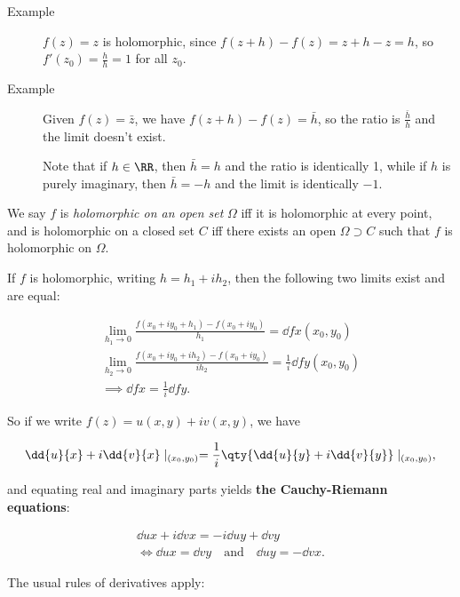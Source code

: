 \begin{description}
\item[Example]
\(f(z) = z\) is holomorphic, since \(f(z+ h) - f(z) = z+h-z = h\), so
\(f'(z_0) = \frac h h = 1\) for all \(z_0\).
\item[Example]
Given \(f(z) = \bar z\), we have \(f(z+h)-f(z) = \bar h\), so the ratio
is \(\frac{\bar h}{h}\) and the limit doesn't exist.

Note that if \(h\in \RR\), then \(\bar h = h\) and the ratio is
identically 1, while if \(h\) is purely imaginary, then \(\bar h = -h\)
and the limit is identically \(-1\).
\end{description}

We say \(f\) is \emph{holomorphic on an open set} \(\Omega\) iff it is
holomorphic at every point, and is holomorphic on a closed set \(C\) iff
there exists an open \(\Omega \supset C\) such that \(f\) is holomorphic
on \(\Omega\).

\begin{description}
\tightlist
\item[Fact]
If \(f\) is holomorphic, writing \(h = h_1 + ih_2\), then the following
two limits exist and are equal:
\end{description}

\begin{align*}
  \lim_{h_1 \to 0} \frac{f(x_0 + iy_0 + h_1) - f(x_0 + iy_0)}{h_1} = \dd{f}{x}(x_0, y_0) \\
  \lim_{h_2 \to 0} \frac{f(x_0 + iy_0 + ih_2) - f(x_0 + iy_0)}{ih_2} = \frac 1 i \dd{f}{y}(x_0, y_0) \\
  \implies \dd{f}{x} = \frac 1  i \dd{f}{y}
  .\end{align*}

So if we write \(f(z) = u(x, y) + i v(x, y)\), we have

\begin{align*}
  \dd{u}{x} + i \dd{v}{x} \mid_{(x_0, y_0)} = \frac 1 i \qty{
  \dd{u}{y} + i \dd{v}{y}
  } \mid_{(x_0, y_0)}
  ,\end{align*}

and equating real and imaginary parts yields \textbf{the Cauchy-Riemann
equations}:

\begin{align*}
  \dd{u}{x} + i \dd{v}{x} = -i \dd{u}{y} + \dd{v}{y} \\
  \iff \dd{u}{x} = \dd{v}{y} \quad\text{and}\quad \dd{u}{y} = - \dd{v}{x}
  .\end{align*}

The usual rules of derivatives apply:

